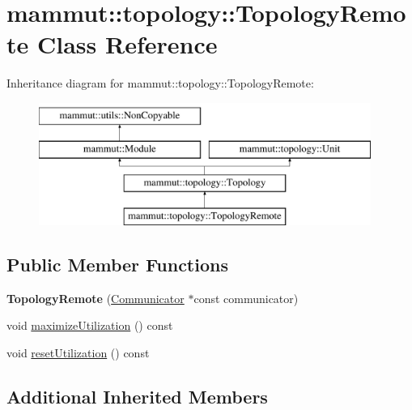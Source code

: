 \hypertarget{classmammut_1_1topology_1_1TopologyRemote}{\section{mammut\-:\-:topology\-:\-:Topology\-Remote Class Reference}
\label{classmammut_1_1topology_1_1TopologyRemote}
}
Inheritance diagram for mammut\-:\-:topology\-:\-:Topology\-Remote\-:\begin{figure}[H]
\begin{center}
\leavevmode
\includegraphics[height=4.000000cm]{classmammut_1_1topology_1_1TopologyRemote}
\end{center}
\end{figure}
\subsection*{Public Member Functions}
\begin{DoxyCompactItemize}
\item 
\hypertarget{classmammut_1_1topology_1_1TopologyRemote_ad08509d1104f3c0b4c5da71befc3da58}{{\bfseries Topology\-Remote} (\hyperlink{classmammut_1_1Communicator}{Communicator} $\ast$const communicator)}\label{classmammut_1_1topology_1_1TopologyRemote_ad08509d1104f3c0b4c5da71befc3da58}

\item 
void \hyperlink{classmammut_1_1topology_1_1TopologyRemote_ae5d75d4398748f79635b74fdcbe1c7f5}{maximize\-Utilization} () const 
\item 
void \hyperlink{classmammut_1_1topology_1_1TopologyRemote_a0544edb42fc7e88e23394d94929e4438}{reset\-Utilization} () const 
\end{DoxyCompactItemize}
\subsection*{Additional Inherited Members}


